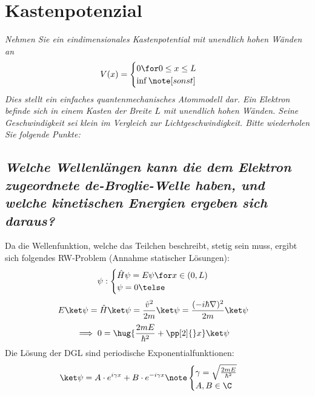 \documentclass[ex, minted]{exercise_4.0}
\begin{document}
\section{Kastenpotenzial}
{\it Nehmen Sie ein eindimensionales Kastenpotential mit unendlich hohen Wänden an
\begin{align*}
    V(x) &= \begin{cases}
        0\for 0\le x\le L\\
        \inf \note[sonst]
    \end{cases}
\end{align*}
Dies stellt ein einfaches quantenmechanisches Atommodell dar. Ein Elektron befinde sich in einem Kasten der
Breite $L$ mit unendlich hohen Wänden. Seine Geschwindigkeit sei klein im Vergleich zur Lichtgeschwindigkeit.
Bitte wiederholen Sie folgende Punkte:}

\subsection{\it Welche Wellenlängen kann die dem Elektron zugeordnete de-Broglie-Welle haben, und welche kinetischen
Energien ergeben sich daraus?}\vspace{1ex}

Da die Wellenfunktion, welche das Teilchen beschreibt, stetig sein muss, ergibt sich folgendes RW-Problem (Annahme statischer Lösungen): 
\begin{align*}
    \psi: \begin{cases}
        \hat H \psi = E\psi \for x\in(0,L)\\
        \psi = 0 \telse
    \end{cases}
\end{align*}
\begin{align*}
    E\ket\psi &= \hat H \ket\psi
    = \frac{\hat v^2}{2m}\ket\psi
    = \frac{(-i\hbar \nabla )^2}{2m}\ket \psi
\end{align*}
\begin{align*}
    \implies 0 &= \hug{\frac{2m E}{\hbar^2} + \pp[2]{}x}\ket \psi  
\end{align*}
Die Lösung der DGL sind periodische Exponentialfunktionen:
\begin{align*}
    \ket \psi &= A \cdot e^{i \gamma x} + B \cdot e^{- i \gamma x}\note \begin{cases}
        \gamma = \sqrt{\frac{2m E}{\hbar^2}}\\
        A,B\in\C
    \end{cases}
\end{align*}
\end{document}
